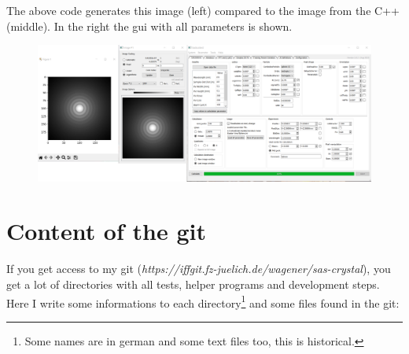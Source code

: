 \documentclass[11pt]{article} %
\begin{document}
The above code generates this image (left) compared to the image from the C++ (middle). In the right the gui with all parameters is shown.
\begin{figure}[H]
 \centering
 \includegraphics[width=\textwidth]{Python2C.png}
\end{figure}




\clearpage
\appendix



\section{Content of the git}

If you get access to my git ({\it https://iffgit.fz-juelich.de/wagener/sas-crystal}), you get a lot of directories with all tests, helper programs and development steps. Here I write some informations to each directory\footnote{Some names are in german and some text files too, this is historical.} and some files found in the git:
\end{document}

